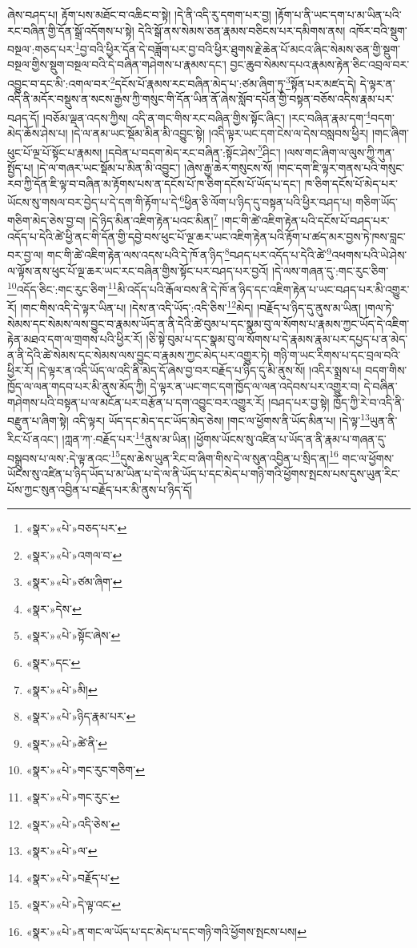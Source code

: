 ཞེས་བཤད་པ། རྟོག་པས་མཐོང་བ་འཆིང་བ་སྟེ། །དེ་ནི་འདི་རུ་དགག་པར་བྱ། །རྟོག་པ་ནི་ཡང་དག་པ་མ་ཡིན་པའི་རང་བཞིན་གྱི་དོན་སྒྲོ་འདོགས་པ་སྟེ། དེའི་སྒོ་ནས་སེམས་ཅན་རྣམས་བཅིངས་པར་དམིགས་ནས། འཁོར་བའི་སྡུག་བསྔལ་:གཅད་པར་\footnote{«སྣར་»«པེ་»བཅད་པར་}བྱ་བའི་ཕྱིར་དོན་དེ་བཟློག་པར་བྱ་བའི་ཕྱིར་ཐུགས་རྗེ་ཆེན་པོ་མངའ་ཞིང་སེམས་ཅན་གྱི་སྡུག་བསྔལ་གྱིས་སྡུག་བསྔལ་བའི་དེ་བཞིན་གཤེགས་པ་རྣམས་དང་། བྱང་ཆུབ་སེམས་དཔའ་རྣམས་རྟེན་ཅིང་འབྲལ་བར་འབྱུང་བ་དང་མི་:འགལ་བར་\footnote{«སྣར་»«པེ་»འགལ་བ་}དངོས་པོ་རྣམས་རང་བཞིན་མེད་པ་:ཙམ་ཞིག་ཏུ་\footnote{«སྣར་»«པེ་»ཙམ་ཞིག་}སྟོན་པར་མཛད་དེ། དེ་ལྟར་ན་འདི་ནི་མདོར་བསྡུས་ན་སངས་རྒྱས་ཀྱི་གསུང་གི་དོན་ཡིན་ནོ་ཞེས་སློབ་དཔོན་གྱི་བསྟན་བཅོས་འདིས་རྣམ་པར་བཤད་དོ། །བཅོམ་ལྡན་འདས་ཀྱིས། འདི་ན་གང་གིས་རང་བཞིན་གྱིས་སྟོང་ཞིང་། །རང་བཞིན་རྣམ་དག་\footnote{«སྣར་»དེས་}བདག་མེད་ཆོས་ཤེས་པ། །དེ་ལ་ནམ་ཡང་སྡོམ་མིན་མི་འབྱུང་སྟེ། །འདི་ལྟར་ཡང་དག་ངེས་ལ་དེས་བསླབས་ཕྱིར། །གང་ཞིག་ཕུང་པོ་ལྔ་པོ་སྟོང་པ་རྣམས། །དབེན་པ་བདག་མེད་རང་བཞིན་:སྟོང་ཤེས་\footnote{«སྣར་»«པེ་»སྟོང་ཞེས་}ཤིང་། །ལས་གང་ཞིག་ལ་ལུས་ཀྱི་ཀུན་སྤྱོད་པ། །དེ་ལ་གཞར་ཡང་སྡོམ་པ་མིན་མི་འབྱུང་། །ཞེས་རྒྱ་ཆེར་གསུངས་སོ། །གང་དག་ཇི་ལྟར་གནས་པའི་གསུང་རབ་ཀྱི་དོན་ཇི་ལྟ་བ་བཞིན་མ་རྟོགས་པས་ན་དངོས་པོ་ཁ་ཅིག་དངོས་པོ་ཡོད་པ་དང་། ཁ་ཅིག་དངོས་པོ་མེད་པར་ཡོངས་སུ་གསལ་བར་བྱེད་པ་དེ་དག་གི་རྟོག་པ་དེ་\footnote{«སྣར་»དང་}ཕྱིན་ཅི་ལོག་པ་ཉིད་དུ་བསྟན་པའི་ཕྱིར་བཤད་པ། གཅིག་ཡོད་གཅིག་མེད་ཅེས་བྱ་བ། །དེ་ཉིད་མིན་འཇིག་རྟེན་པའང་མིན།\footnote{«སྣར་»«པེ་»མི།} །གང་གི་ཚེ་འཇིག་རྟེན་པའི་དངོས་པོ་བཤད་པར་འདོད་པ་དེའི་ཚེ་ཕྱི་ནང་གི་དོན་གྱི་དབྱེ་བས་ཕུང་པོ་ལྔ་ཆར་ཡང་འཇིག་རྟེན་པའི་རྟོག་པ་ཚད་མར་བྱས་ཏེ་ཁས་བླང་བར་བྱ་ལ། གང་གི་ཚེ་འཇིག་རྟེན་ལས་འདས་པའི་དེ་ཁོ་ན་ཉིད་\footnote{«སྣར་»«པེ་»ཉིད་རྣམ་པར་}བཤད་པར་འདོད་པ་དེའི་ཚེ་\footnote{«སྣར་»«པེ་»ཚེ་ནི་}འཕགས་པའི་ཡེ་ཤེས་ལ་ལྟོས་ནས་ཕུང་པོ་ལྔ་ཆར་ཡང་རང་བཞིན་གྱིས་སྟོང་པར་བཤད་པར་བྱའོ། །དེ་ལས་གཞན་དུ་:གང་རུང་ཅིག་\footnote{«སྣར་»«པེ་»གང་རུང་གཅིག་}འདོད་ཅིང་:གང་རུང་ཅིག་\footnote{«སྣར་»«པེ་»གང་རུང་}མི་འདོད་པའི་རྒོལ་བས་ནི་དེ་ཁོ་ན་ཉིད་དང་འཇིག་རྟེན་པ་ཡང་བཤད་པར་མི་འགྱུར་རོ། །གང་གིས་འདི་དེ་ལྟར་ཡིན་པ། །དེས་ན་འདི་ཡོད་:འདི་ཅིས་\footnote{«སྣར་»«པེ་»འདི་ཅེས་}མེད། །བརྗོད་པ་ཉིད་དུ་ནུས་མ་ཡིན། །གལ་ཏེ་སེམས་དང་སེམས་ལས་བྱུང་བ་རྣམས་ཡོད་ན་ནི་དེའི་ཚེ་བུམ་པ་དང་སྣམ་བུ་ལ་སོགས་པ་རྣམས་ཀྱང་ཡོད་དེ་འཇིག་རྟེན་མཐའ་དག་ལ་གྲགས་པའི་ཕྱིར་རོ། །ཅི་སྟེ་བུམ་པ་དང་སྣམ་བུ་ལ་སོགས་པ་དེ་རྣམས་རྣམ་པར་དཔྱད་པ་ན་མེད་ན་ནི་དེའི་ཚེ་སེམས་དང་སེམས་ལས་བྱུང་བ་རྣམས་ཀྱང་མེད་པར་འགྱུར་ཏེ། གཉི་ག་ཡང་རིགས་པ་དང་བྲལ་བའི་ཕྱིར་རོ། །དེ་ལྟར་ན་འདི་ཡོད་ལ་འདི་ནི་མེད་དོ་ཞེས་བྱ་བར་བརྗོད་པ་ཉིད་དུ་མི་ནུས་སོ། །འདིར་སྨྲས་པ། བདག་གིས་ཁྱོད་ལ་ལན་གདབ་པར་མི་ནུས་མོད་ཀྱི། དེ་ལྟར་ན་ཡང་གང་དག་ཁྱོད་ལ་ལན་འདེབས་པར་འགྱུར་བ། དེ་བཞིན་གཤེགས་པའི་བསྟན་པ་ལ་མངོན་པར་བརྩོན་པ་དག་འབྱུང་བར་འགྱུར་རོ། །བཤད་པར་བྱ་སྟེ། ཁྱོད་ཀྱི་རེ་བ་འདི་ནི་བརྫུན་པ་ཞིག་སྟེ། འདི་ལྟར། ཡོད་དང་མེད་དང་ཡོད་མེད་ཅེས། །གང་ལ་ཕྱོགས་ནི་ཡོད་མིན་པ། །དེ་ལྟ་\footnote{«སྣར་»«པེ་»ལ་}ཡུན་ནི་རིང་པོ་ནའང་། །ཀླན་ཀ་:བརྗོད་པར་\footnote{«སྣར་»«པེ་»བརྗོད་པ་}ནུས་མ་ཡིན། །ཕྱོགས་ཡོངས་སུ་འཛིན་པ་ཡོད་ན་ནི་རྣམ་པ་གཞན་དུ་བསྒྲུབས་པ་ལས་:དེ་ལྟ་ནའང་\footnote{«སྣར་»«པེ་»དེ་ལྟ་འང་}དུས་ཆེས་ཡུན་རིང་བ་ཞིག་གིས་དེ་ལ་སུན་འབྱིན་པ་སྲིད་ན།\footnote{«སྣར་»«པེ་»ན་གང་ལ་ཡོད་པ་དང་མེད་པ་དང་གཉི་གའི་ཕྱོགས་སྤངས་པས།} གང་ལ་ཕྱོགས་ཡོངས་སུ་འཛིན་པ་ཉིད་ཡོད་པ་མ་ཡིན་པ་དེ་ལ་ནི་ཡོད་པ་དང་མེད་པ་གཉི་གའི་ཕྱོགས་སྤངས་པས་དུས་ཡུན་རིང་པོས་ཀྱང་སུན་འབྱིན་པ་བརྗོད་པར་མི་ནུས་པ་ཉིད་དོ། 